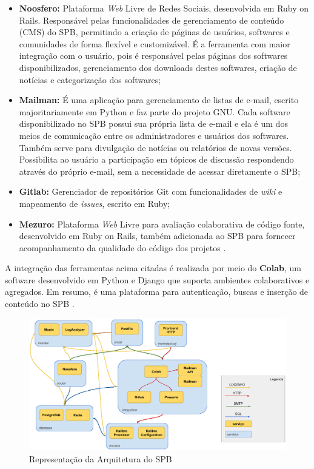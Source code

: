\begin{itemize}
  \item \textbf{Noosfero:} Plataforma \textit{Web} Livre de Redes Sociais, desenvolvida
	em Ruby on Rails. Responsável pelas funcionalidades de gerenciamento de
	conteúdo (CMS) do SPB, permitindo a criação de páginas de usuários, softwares
	e comunidades de forma flexível e customizável. É a ferramenta com maior
	integração com o usuário, pois é responsável pelas páginas dos softwares
	disponibilizados, gerenciamento dos downloads destes softwares, criação de
	notícias e categorização dos softwares;
  \item \textbf{Mailman:} É uma aplicação para gerenciamento de listas de
	e-mail, escrito majoritariamente em Python e faz parte do projeto GNU. Cada
	software disponibilizado no SPB possui sua própria lista de e-mail e ela é um
	dos meios de comunicação entre os administradores e usuários dos softwares.
	Também serve para divulgação de notícias ou relatórios de novas versões.
	Possibilita ao usuário a participação em tópicos de discussão respondendo
	através do próprio e-mail, sem a necessidade de acessar diretamente o SPB;
	\item \textbf{Gitlab:} Gerenciador de repositórios Git com funcionalidades de
	\textit{wiki} e mapeamento de \textit{issues}, escrito em Ruby;
	\item \textbf{Mezuro:} Plataforma \textit{Web} Livre para avaliação colaborativa de
	código fonte, desenvolvido em Ruby on Rails, também adicionada ao SPB para
	fornecer acompanhamento da qualidade do código dos projetos \cite{aboutSPB}.
\end{itemize}

A integração das ferramentas acima citadas é realizada por meio do
\textbf{Colab}, um software desenvolvido em Python e Django que suporta
ambientes colaborativos e agregados. Em resumo, é uma plataforma para
autenticação, buscas e inserção de conteúdo no SPB \cite{aboutSPB}.

\begin{figure}[!htb]
	\centering
    \includegraphics[keepaspectratio=true,scale=0.3]
    {figuras/arquitetura_spb.eps}
  \caption{Representação da Arquitetura do SPB \cite{archSPB}}
  \label{fig:arquitetura_spb}
\end{figure}

